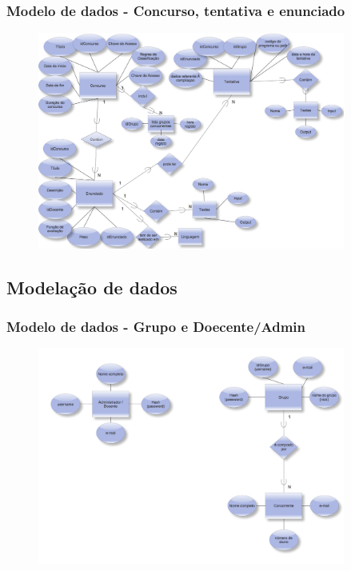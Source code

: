 \documentclass{beamer}
\begin{document}
\begin{frame} \frametitle{Modelo de dados - Concurso, tentativa e enunciado}
\begin{figure}[htbp]
\begin{center}
\includegraphics[width=0.9\textwidth]{../report1/Images/concurso-enunciado}
\end{center}
\end{figure}
\end{frame}

\subsection{Modelação de dados}
\begin{frame} \frametitle{Modelo de dados - Grupo e Doecente/Admin}
\begin{figure}[htbp]
\begin{center}
\includegraphics[width=0.9\textwidth]{../report1/Images/grupo-docente}
\end{center}
\end{figure}
\end{frame}
\end{document}
